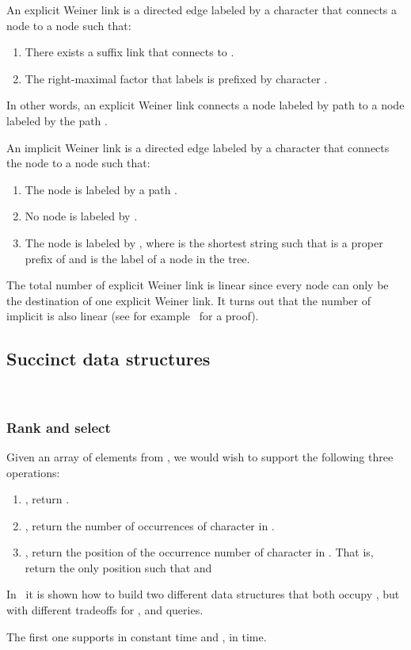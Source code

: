 \documentclass[a4paper]{article}
\begin{document}
An explicit Weiner link is a directed edge labeled by a character  that connects a node  to a node  such that:
\begin{enumerate}
\item There exists a suffix link that connects  to . 
\item The right-maximal factor that labels  is prefixed by character . 
\end{enumerate}
In other words, an explicit Weiner link connects a node labeled by path  to a node labeled by 
the path . 

An implicit Weiner link is a directed edge labeled by a character  that connects the node  to a node  such that: 
\begin{enumerate}
\item The node  is labeled by a path . 
\item No node is labeled by . 
\item The node  is labeled by , where  is the shortest string such that  is a proper 
prefix of  and  is the label of a node in the tree. 
\end{enumerate}
The total number of explicit Weiner link is linear since every node can only be the destination of one explicit Weiner link. 
It turns out that the number of implicit is also linear (see for example~\cite{BNtalg14} for a proof). 

\subsection{Succinct data structures}
~\label{sec:succ_DS}
\subsubsection{Rank and select}
Given an array  of  elements from , we would wish to support the following three operations: 
\begin{enumerate}
\item , return . 
\item , return the number of occurrences of character  in . 
\item , return the position of the occurrence number  of character  in . That 
is, return the only position  such that  and 
\end{enumerate}
In~\cite{GMR06} it is shown how to build two different data structures that both occupy , 
but with different tradeoffs for ,  and  queries.

The first one supports  in constant time and ,  in  time. 
\end{document}

